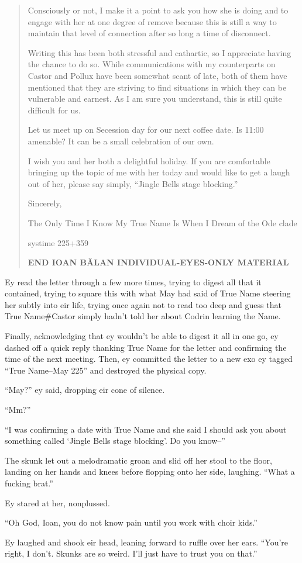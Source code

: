 \begin{quote}
Consciously or not, I make it a point to ask you how she is doing and to engage with her at one degree of remove because this is still a way to maintain that level of connection after so long a time of disconnect.

Writing this has been both stressful and cathartic, so I appreciate having the chance to do so. While communications with my counterparts on Castor and Pollux have been somewhat scant of late, both of them have mentioned that they are striving to find situations in which they can be vulnerable and earnest. As I am sure you understand, this is still quite difficult for us.

Let us meet up on Secession day for our next coffee date. Is 11:00 amenable? It can be a small celebration of our own.

I wish you and her both a delightful holiday. If you are comfortable bringing up the topic of me with her today and would like to get a laugh out of her, please say simply, ``Jingle Bells stage blocking.''

Sincerely,

The Only Time I Know My True Name Is When I Dream of the Ode clade

systime 225+359

\textbf{END IOAN BĂLAN INDIVIDUAL-EYES-ONLY MATERIAL}
\end{quote}

Ey read the letter through a few more times, trying to digest all that it contained, trying to square this with what May had said of True Name steering her subtly into eir life, trying once again not to read too deep and guess that True Name\#Castor simply hadn't told her about Codrin learning the Name.

Finally, acknowledging that ey wouldn't be able to digest it all in one go, ey dashed off a quick reply thanking True Name for the letter and confirming the time of the next meeting. Then, ey committed the letter to a new exo ey tagged ``True Name--May 225'' and destroyed the physical copy.

``May?'' ey said, dropping eir cone of silence.

``Mm?''

``I was confirming a date with True Name and she said I should ask you about something called `Jingle Bells stage blocking'. Do you know--''

The skunk let out a melodramatic groan and slid off her stool to the floor, landing on her hands and knees before flopping onto her side, laughing. ``What a fucking brat.''

Ey stared at her, nonplussed.

``Oh God, Ioan, you do not know pain until you work with choir kids.''

Ey laughed and shook eir head, leaning forward to ruffle over her ears. ``You're right, I don't. Skunks are so weird. I'll just have to trust you on that.''
